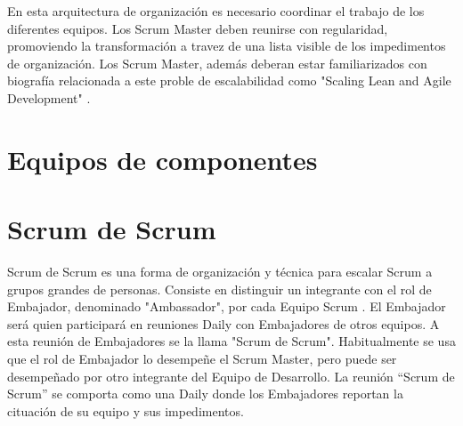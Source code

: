 En esta arquitectura de organización es necesario coordinar el trabajo de los diferentes equipos. Los Scrum Master deben reunirse con regularidad, promoviendo la transformación a travez de una lista visible de los impedimentos de organización. Los Scrum Master, además deberan estar familiarizados con biografía relacionada a este proble de escalabilidad como "Scaling Lean and Agile Development" \cite{Larman-Vodde-2008}.

\section{Equipos de componentes}

\section{Scrum de Scrum}

Scrum de Scrum es una forma de organización y técnica para escalar Scrum a grupos grandes de personas. Consiste en distinguir un integrante con el rol de Embajador, denominado "Ambassador", por cada Equipo Scrum \cite{Stefanini-2013}. El Embajador será quien participará en reuniones Daily con Embajadores de otros equipos. A esta reunión de Embajadores se la llama "Scrum de Scrum". Habitualmente se usa que el rol de Embajador lo desempeñe el Scrum Master, pero puede ser desempeñado por otro integrante del Equipo de Desarrollo. La reunión “Scrum de Scrum” se comporta como una Daily donde los Embajadores reportan la cituación de su equipo y sus impedimentos.
